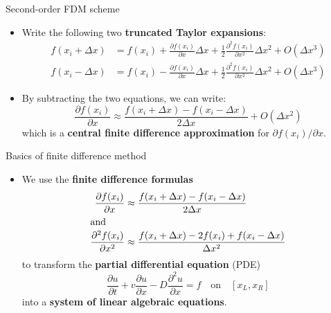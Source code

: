 %
\begin{frame}{Second-order FDM scheme}
\begin{itemize}
\item Write the following two {\bf truncated Taylor expansions}:
\begin{align*}
f(x_{i}+\Delta x) & =f(x_{i})+\frac{\partial f(x_{i})}{\partial x}\Delta x+\frac{1}{2}\frac{\partial^{2}f(x_{i})}{\partial x^{2}}\Delta x^{2}+O(\Delta x^{3})\\
f(x_{i}-\Delta x) & =f(x_{i})-\frac{\partial f(x_{i})}{\partial x}\Delta x+\frac{1}{2}\frac{\partial^{2}f(x_{i})}{\partial x^{2}}\Delta x^{2}+O(\Delta x^{3})
\end{align*}
%
\item By subtracting the two equations, we can write:
\[
\frac{\partial f(x_{i})}{\partial x}\approx\frac{f(x_{i}+\Delta x)-f(x_{i}-\Delta x)}{2\Delta x}+O(\Delta x^{2})
\]
which is a \alert{\bf central finite difference approximation} for $\partial f(x_{i})/\partial x$.
\end{itemize}
\end{frame}
%
%
\begin{frame}{Basics of finite difference method}
\begin{itemize}
\item We use the \alert{\bf finite difference formulas}
\begin{align*}
\frac{\partial f(x_{i})}{\partial x} & \approx\frac{f(x_{i}+\Delta x)-f(x_{i}-\Delta x)}{2\Delta x}\\
\shortintertext{and}\frac{\partial^{2}f(x_{i})}{\partial x^{2}} & \approx\frac{f(x_{i}+\Delta x)-2f(x_{i})+f(x_{i}-\Delta x)}{\Delta x^{2}}
\end{align*}
to transform the \textbf{partial differential equation} (PDE)
\[
\frac{\partial u}{\partial t}+v\frac{\partial u}{\partial x}-D\frac{\partial^{2}u}{\partial x}=f \quad \mbox{on} \quad [x_L, x_R]
\]
into a \textbf{system of linear algebraic equations}.
\end{itemize}
\end{frame}
%
